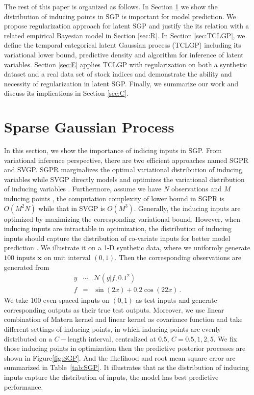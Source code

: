 \documentclass{article}
\begin{document}
The rest of this paper is organized as follows. In Section \ref{sec:SGP} we show the distribution of inducing points in SGP is important for model prediction. We propose regularization approach for latent SGP and justify the its relation with a related empirical Bayesian model in Section \ref{sec:R}. In Section \ref{sec:TCLGP}, we define the temporal categorical latent Gaussian process (TCLGP) including its variational lower bound, predictive density and algorithm for inference of latent variables. Section \ref{sec:E} applies TCLGP with regularization on both a synthetic dataset and a real data set of stock indices and demonstrate the ability and necessity of regularization in latent SGP. Finally, we summarize our work and discuss its implications in Section \ref{sec:C}.


\section{Sparse Gaussian Process} \label{sec:SGP}
In this section, we show the importance of indicing inputs in SGP. From variational inference perspective, there are two efficient approaches named SGPR and SVGP. SGPR marginalizes the optimal variational distribution of inducing variables \citep{Titsias_2009} while SVGP directly models and optimizes the variational distribution of inducing variables \citep{Hensman_2013}. Furthermore, assume we have $N$ observations and $M$ inducing points , the computation complexity of lower bound in SGPR is $O(M^2N)$ while that in SVGP is $O(M^3)$. Generally, the inducing inputs are optimized by maximizing the corresponding variational bound. However, when inducing inputs are intractable in optimization, the distribution of inducing inputs should capture the distribution of co-variate inputs for better model prediction \cite{Raj_2011}. We illustrate it on a 1-D synthetic data, where we uniformly generate $100$ inputs $\bm x$ on unit interval $(0,1)$. Then the corresponding observations are generated from 
\begin{eqnarray}
y & \sim & \mathcal{N}(y|f, 0.1^2) \nonumber \\
f & = & \sin(2x) + 0.2\cos(22x) \nonumber \,.
\end{eqnarray} 
We take $100$ even-spaced inputs on $(0,1)$ as test inputs and generate corresponding outputs as their true test outputs. Moreover, we use linear combination of Matern kernel and linear kernel as covariance function and take different settings of inducing points, in which inducing points are evenly distributed on a $C-$length interval, centralized at $0.5$, $C = 0.5, 1, 2, 5$. We fix those inducing points in optimization then the predictive posterior processes are shown in Figure\ref{fig:SGP}. And the likelihood and root mean square error are summarized in Table~\ref{tab:SGP}. It illustrates that as the distribution of inducing inputs capture the distribution of inputs, the model has best predictive performance.
\end{document}
